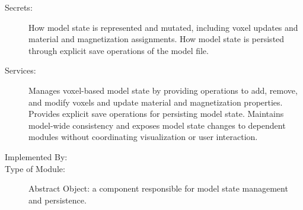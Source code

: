 \documentclass[12pt, titlepage]{article}
\begin{document}
\begin{description}
\item[Secrets:] How model state is represented and mutated, including voxel updates and material and magnetization assignments. How model state is persisted through explicit save operations of the model file.
\item[Services:] Manages voxel-based model state by providing operations to add, remove, and modify voxels and update material and magnetization properties. Provides explicit save operations for persisting model state. Maintains model-wide consistency and exposes model state changes to dependent modules without coordinating visualization or user interaction.
\item[Implemented By:] \progname{}
\item[Type of Module:] Abstract Object: a component responsible for model state management and persistence.
\end{description}

\end{document}
